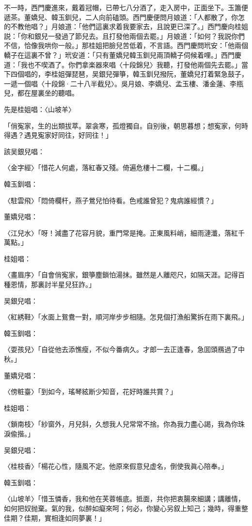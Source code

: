 不一時，西門慶進來，戴着冠帽，已帶七八分酒了，走入房中，正面坐下。玉簫便遞茶。董嬌兒、韓玉釧兒，二人向前磕頭。西門慶便問月娘道：「人都散了，你怎的不教他唱？」月娘道：「他們這裏求着我要家去，且說更已深了。」西門慶向桂姐説：「你和銀兒一發過了節兒去。且打發他兩個去罷。」月娘道：「如何？我説你們不信，恰像我哄你一般。」那桂姐把臉兒苦低着，不言語。西門慶問玳安：「他兩個轎子在這裏不曾？」玳安道：「只有董嬌兒韓玉釧兒兩頂轎子伺候着哩。」西門慶道：「我也不喫酒了。你們拿楽器來唱〈十段錦兒〉我聽，打發他兩個先去罷。」當下四個唱的，李桂姐彈琵琶，吴銀兒彈箏，韓玉釧兒撥阮，董嬌兒打着緊急鼓子，一遞一個唱〈十段錦·二十八半截兒〉。吳月娘、李嬌兒、孟玉樓、潘金蓮、李瓶兒，都在屋裏坐的聽唱。

先是桂姐唱：〈山坡羊〉

「俏寃家，生的出類拔萃。翠衾寒，孤燈獨自。自别後，朝思暮想；想寃家，何時得遇？遇見寃家好同往，好同往！」

該吴銀兒唱：

〈金字經〉「惜花人何處，落紅春又殘。倚遍危樓十二欄，十二欄。」

韓玉釧唱：

〈駐雲飛〉「悶倚欄杆，燕子鶯兒怕待看。色戒誰曾犯？鬼病誰經慣？」

董嬌兒唱：

〈江兒水〉「呀！減盡了花容月貌，重門常是掩。正東風料峭，細雨漣瀸，落紅千萬點。」

桂姐唱：

〈畫眉序〉「自會俏寃家，銀箏塵鎖怕湯抹。雖然是人離咫尺，如隔天涯。記得百種恩情，那裏討半星兒狂詐。」

吴銀兒唱：

〈紅綉鞋〉「水面上鴛鴦一對，順河岸步步相隨。怎見個打漁船驚拆在雨下裏飛。」

韓玉釧唱：

〈耍孩兒〉「自從他去添憔瘦，不似今番病久。才郎一去正逢春，急囬頭鴈過了中秋。」

董嬌兒唱：

〈傍粧臺〉「到如今，瑤琴絃断少知音，花好時誰共賞？」

桂姐唱：

〈鎖南枝〉「紗窗外，月兒斜，久想我人兒常常不捨。你為我力盡心謁，我為你珠淚偸揩。」

吴銀兒唱：

〈桂枝香〉「楊花心性，隨風不定。他原來假意兒虚名，倒使我眞心陪奉。」

韓玉釧唱：

〈山坡羊〉「惜玉憐香，我和他在芙蓉帳底。抵面，共你把衷腸來細講；講離情，如何把奴抛棄。氣的我，似醉如癡來呵；何必，你變心另叙上知己；幾時，得重整佳期？佳期，實相逢如同夢裏！」

